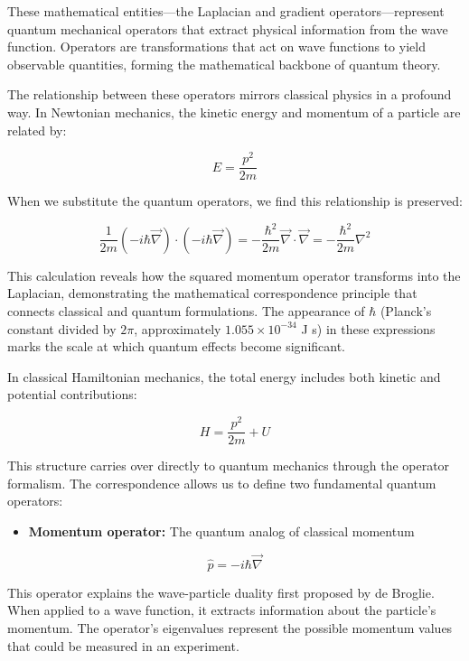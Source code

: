 \documentclass[italian]{HKNdocument}
\begin{document}
These mathematical entities—the Laplacian and gradient operators—represent quantum mechanical operators that extract physical information from the wave function. Operators are transformations that act on wave functions to yield observable quantities, forming the mathematical backbone of quantum theory.

The relationship between these operators mirrors classical physics in a profound way. In Newtonian mechanics, the kinetic energy and momentum of a particle are related by:

\begin{equation}
E=\frac{p^{2}}{2 m}
\end{equation}

When we substitute the quantum operators, we find this relationship is preserved:

\begin{equation}
\frac{1}{2 m}(-i \hbar \vec{\nabla}) \cdot(-i \hbar \vec{\nabla})=-\frac{\hbar^{2}}{2 m} \vec{\nabla} \cdot \vec{\nabla}=-\frac{\hbar^{2}}{2 m} \nabla^{2}
\end{equation}

This calculation reveals how the squared momentum operator transforms into the Laplacian, demonstrating the mathematical correspondence principle that connects classical and quantum formulations. The appearance of $\hbar$ (Planck's constant divided by $2\pi$, approximately $1.055 \times 10^{-34}$ J s) in these expressions marks the scale at which quantum effects become significant.

In classical Hamiltonian mechanics, the total energy includes both kinetic and potential contributions:

\begin{equation}
H=\frac{p^{2}}{2 m}+U
\end{equation}

This structure carries over directly to quantum mechanics through the operator formalism. The correspondence allows us to define two fundamental quantum operators:

\begin{itemize}
  \item \textbf{Momentum operator:} The quantum analog of classical momentum
\end{itemize}

\begin{equation}
\hat{p}=-i \hbar \vec{\nabla}
\end{equation}

This operator explains the wave-particle duality first proposed by de Broglie. When applied to a wave function, it extracts information about the particle's momentum. The operator's eigenvalues represent the possible momentum values that could be measured in an experiment.
\end{document}
